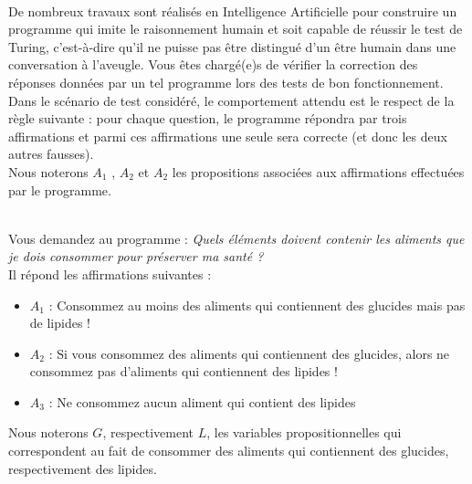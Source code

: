 \documentclass[11pt,a4paper]{article}
\begin{document}
\begin{Exercise}[title = {Logique et calcul des propositions}, origin = {\bac \; {\sc ccp 2015}}]\\
De nombreux travaux sont réalisés en Intelligence Artificielle pour construire un programme qui imite le raisonnement humain et soit capable de réussir le test de Turing, c’est-à-dire qu’il ne puisse pas être distingué d’un être humain dans une conversation à l’aveugle. Vous êtes chargé(e)s de vérifier la correction des réponses données par un tel programme lors des tests de bon fonctionnement. Dans le scénario de test considéré, le comportement attendu est le respect de la règle suivante : pour chaque question, le programme répondra par trois affirmations et parmi ces affirmations une seule sera correcte (et donc les deux autres fausses). \\
Nous noterons $A_1$ , $A_2$ et $A_2$ les propositions associées aux affirmations effectuées par le programme.


\ExePart[name = Premier cas]\\
Vous demandez au programme : \og {} \textit{Quels éléments doivent contenir les aliments que je dois consommer pour préserver ma santé ?}\fg{}\\
Il répond les affirmations suivantes :
\begin{itemize}
	\item[] $A_1$ : Consommez au moins des aliments qui contiennent des glucides mais pas de lipides !
	\item[] $A_2$ : Si vous consommez des aliments qui contiennent des glucides, alors ne consommez pas d'aliments qui contiennent des lipides !
	\item[] $A_3$ : Ne consommez aucun aliment qui contient des lipides
\end{itemize}
Nous noterons $G$, respectivement $L$, les variables propositionnelles qui correspondent au fait de consommer des aliments qui contiennent des glucides, respectivement des lipides.


\end{Exercise}
\end{document}
